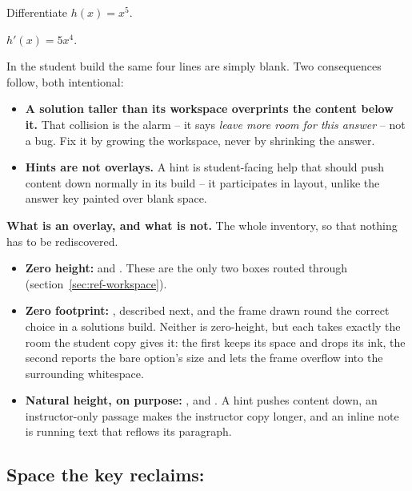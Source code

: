 \begin{manexample}
\preserveworkspace
\begin{problem}
  Differentiate $h(x) = x^{5}$.
\end{problem}
\begin{solution}[notitle]
  $h'(x) = 5x^{4}$.
\end{solution}
\workspace[4]
\end{manexample}

In the student build the same four lines are simply blank. Two consequences
follow, both intentional:

\begin{itemize}
  \item \textbf{A solution taller than its workspace overprints the content
    below it.} That collision is the alarm -- it says \emph{leave more room
    for this answer} -- not a bug. Fix it by growing the workspace, never by
    shrinking the answer.
  \item \textbf{Hints are not overlays.} A hint is student-facing help that
    should push content down normally in its build -- it participates in
    layout, unlike the answer key painted over blank space.
\end{itemize}

\textbf{What is an overlay, and what is not.}
The whole inventory, so that nothing has to be rediscovered.
\begin{itemize}
  \item \textbf{Zero height:}  and .
    These are the only two boxes routed through  (section~\ref{sec:ref-workspace}).
  \item \textbf{Zero footprint:} , described next, and the frame drawn round the correct choice in a solutions build.
    Neither is zero-height, but each takes exactly the room the student copy gives it: the first keeps its space and drops its ink, the second reports the bare option's size and lets the frame overflow into the surrounding whitespace.
  \item \textbf{Natural height, on purpose:} ,  and .
    A hint pushes content down, an instructor-only  passage makes the instructor copy longer, and an inline note is running text that reflows its paragraph.
\end{itemize}

\subsection{Space the key reclaims: }


